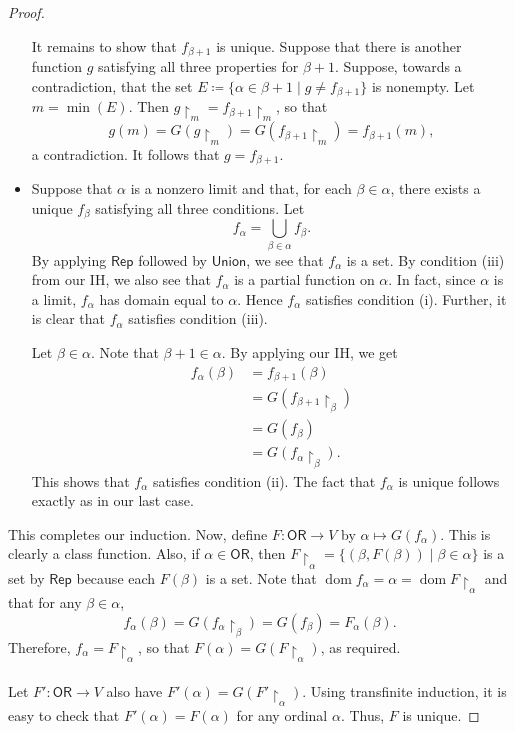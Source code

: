 \documentclass[10pt,letterpaper,cm]{nupset}
\theoremstyle{definition}
\theoremstyle{theorem}
\theoremstyle{remark}
\newcommand{\1}{\mathbf{1}}
\newcommand{\0}{\vec 0}
\newcommand{\ord}{\mathsf{OR}}
\DeclareMathOperator{\dom}{dom}
\begin{document}
\begin{proof}
\begin{itemize}
 It remains to show that $f_{\beta +1}$ is unique. Suppose that there is another function $g$ satisfying all three properties for $\beta +1$. Suppose, towards a contradiction, that the set $E\coloneqq \{\alpha  \in \beta +1 \mid g \ne f_{\beta +1}\}$ is nonempty. Let $m = \min(E)$. Then $g\restriction_m = f_{\beta +1}\restriction_m $, so that $$g(m) = G(g\restriction_m)  = G(f_{\beta +1}\restriction_m) = f_{\beta +1}(m),$$ a contradiction. It follows that $g = f_{\beta +1}$.
\item Suppose that $\alpha$ is a nonzero limit and that, for each $\beta \in \alpha$, there exists a unique $f_{\beta}$ satisfying all three conditions. Let $$f_{\alpha} =\bigcup_{\beta \in \alpha} f_{\beta}.$$ By applying $\mathsf{Rep}$ followed by $\mathsf{Union}$, we see that $f_{\alpha}$ is a set. By condition (iii) from our IH, we also see that $f_{\alpha}$ is a partial function on $\alpha$. In fact, since $\alpha$ is a limit, $f_{\alpha}$ has domain equal to $\alpha$. Hence $f_{\alpha}$ satisfies condition (i). Further, it is clear that $f_{\alpha}$ satisfies condition (iii). 

Let $\beta \in \alpha$. Note that $\beta +1 \in \alpha$. By applying our IH, we get
\begin{align*}
f_{\alpha}(\beta) & = f_{\beta +1}(\beta)  
\\ &  = G(f_{\beta +1}\restriction_{\beta}) 
\\ & = G(f_{\beta})  
\\ & = G(f_{\alpha}\restriction_{\beta}).
\end{align*}
This shows that $f_{\alpha}$ satisfies condition (ii). The fact that $f_{\alpha}$ is unique follows exactly as in our last case.
\end{itemize}$ $This completes our induction. Now, define $F: \ord \to V$ by $\alpha \mapsto G(f_{\alpha})$. This is clearly a class function. Also, if $\alpha \in \ord$, then $F\restriction_{\alpha} = \{(\beta, F(\beta)) \mid \beta \in \alpha\}$ is a set by $\mathsf{Rep}$ because  each $F(\beta)$ is a set. Note that $\dom{f_{\alpha}} = \alpha = \dom{F\restriction_{\alpha}}$ and that for any $\beta \in \alpha$,
$$  f_{\alpha}(\beta) = G(f_{\alpha}\restriction_{\beta}) =  G(f_{\beta})= F_{\alpha}(\beta)  .$$ Therefore, $f_{\alpha} = F\restriction_{\alpha}$, so that $F(\alpha) = G(F\restriction_{\alpha})$, as required. 
\\ \\
Let $F' : \ord \to V$ also have $F'(\alpha) = G(F'\restriction_{\alpha})$. Using transfinite induction, it is easy to check that $F'(\alpha) = F(\alpha)$ for any ordinal $\alpha$. Thus, $F$ is unique. 
\end{proof}
\end{document}

